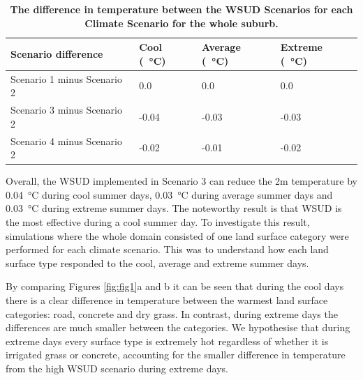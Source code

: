 \documentclass[final,3p,times,authoryear]{elsarticle}
\begin{document}
\begin{table}[!htbp]
\caption{\bf The difference in temperature between the WSUD Scenarios for each Climate Scenario for the whole suburb.  \label{tab:scenarioDiff}}     
\begin{tabular}{ l l l l}
\textbf{Scenario difference} & \textbf{Cool (\SI{}{\degreeCelsius})}
& \textbf{Average (\SI{}{\degreeCelsius})}
& \textbf{Extreme (\SI{}{\degreeCelsius})}\\ \hline
Scenario 1 minus Scenario 2 & 0.0  & 0.0 & 0.0\\ 
Scenario 3 minus Scenario 2 & -0.04  & -0.03 & -0.03\\ 
Scenario 4 minus Scenario 2 & -0.02  & -0.01 & -0.02\\ 
\hline
\end{tabular}
\end{table}



Overall, the WSUD implemented in Scenario 3 can reduce the 2m temperature by 0.04\SI{}{\degreeCelsius} during cool summer days, 0.03\SI{}{\degreeCelsius} during average summer days and 0.03\SI{}{\degreeCelsius} during extreme summer days. The noteworthy result is that WSUD is the most effective during a cool summer day. To investigate this result, simulations where the whole domain consisted of one land surface category were performed for each climate scenario. This was to understand how each land surface type responded to the cool, average and extreme summer days.

By comparing Figures \ref{fig:fig1}a and b it can be seen that during the cool days there is a clear difference in temperature between the warmest land surface categories: road, concrete and dry grass. In contrast, during extreme days the differences are much smaller between the categories. We hypothesise that during extreme days every surface type is extremely hot regardless of whether it is irrigated grass or concrete, accounting for the smaller difference in temperature from the high WSUD scenario during extreme days.
\end{document}
